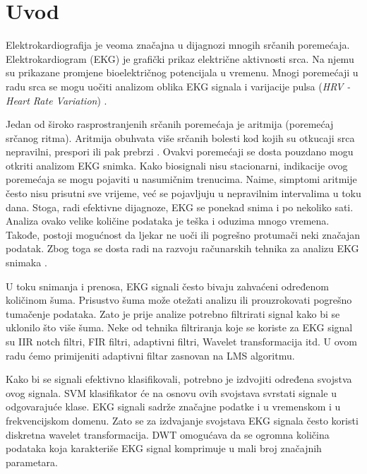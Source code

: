 \documentclass[12pt]{SeminarskiADS}
\begin{document}
\maketitle 


\section{Uvod}
Elektrokardiografija je veoma značajna u dijagnozi mnogih srčanih poremećaja. Elektrokardiogram (EKG) je grafički prikaz električne aktivnosti srca. Na njemu su prikazane promjene bioelektričnog potencijala u vremenu. Mnogi poremećaji u radu srca se mogu uočiti analizom oblika EKG signala i varijacije pulsa (\emph{HRV - Heart Rate Variation}) \cite{gl}. 

Jedan od široko rasprostranjenih srčanih poremećaja je aritmija (poremećaj srčanog ritma). Aritmija obuhvata više srčanih bolesti kod kojih su otkucaji srca nepravilni, prespori ili pak prebrzi \cite{what_is_arr}. Ovakvi poremećaji se dosta pouzdano mogu otkriti analizom EKG snimka. Kako biosignali nisu stacionarni, indikacije ovog poremećaja se mogu pojaviti u nasumičnim trenucima. Naime, simptomi aritmije često nisu prisutni sve vrijeme, već se pojavljuju u nepravilnim intervalima u toku dana. Stoga, radi efektivne dijagnoze, EKG se ponekad snima i po nekoliko sati. Analiza ovako velike količine podataka je teška i oduzima mnogo vremena. Takođe, postoji mogućnost da ljekar ne uoči ili pogrešno protumači neki značajan podatak. Zbog toga se dosta radi na razvoju računarskih tehnika za analizu EKG snimaka \cite{ecg_multiclass_svm}.

U toku snimanja i prenosa, EKG signali često bivaju zahvaćeni određenom količinom šuma. Prisustvo šuma može otežati analizu ili prouzrokovati pogrešno tumačenje podataka. Zato je prije analize potrebno filtrirati signal kako bi se uklonilo što više šuma. Neke od tehnika filtriranja koje se koriste za EKG signal su IIR notch filtri, FIR filtri, adaptivni filtri, Wavelet transformacija itd. \cite{ecg_denoise} U ovom radu ćemo primijeniti adaptivni filtar zasnovan na LMS algoritmu. 

Kako bi se signali efektivno klasifikovali, potrebno je izdvojiti određena svojstva ovog signala. SVM klasifikator će na osnovu ovih svojstava svrstati signale u odgovarajuće klase. EKG signali sadrže značajne podatke i u vremenskom i u frekvencijskom domenu. Zato se za izdvajanje svojstava EKG signala često koristi diskretna wavelet transformacija. DWT omogućava da se ogromna količina podataka koja karakteriše EKG signal komprimuje u mali broj značajnih parametara. 
\end{document}

